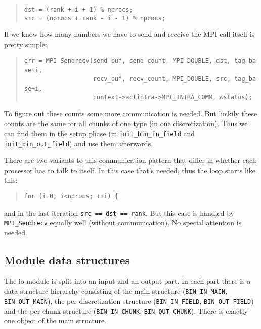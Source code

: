 \begin{quote}
\texttt{dst~=~(rank~+~i~+~1)~{\%}~nprocs;~}~\\
 \texttt{src~=~(nprocs~+~rank~-~i~-~1)~{\%}~nprocs; }
\end{quote}
If we know how many numbers we have to send and receive the MPI call
itself is pretty simple: 

\begin{quote}
\texttt{err~=~MPI{\_}Sendrecv(send{\_}buf,~send{\_}count,~MPI{\_}DOUBLE,~dst,~tag{\_}base+i,~}~\\
 \texttt{~~~~~~~~~~~~~~~~~~~recv{\_}buf,~recv{\_}count,~MPI{\_}DOUBLE,~src,~tag{\_}base+i,~}~\\
 \texttt{~~~~~~~~~~~~~~~~~~~context->actintra->MPI{\_}INTRA{\_}COMM,~{\&}status); }
\end{quote}
To figure out these counts some more communication is needed. But
luckily these counts are the same for all chunks of one type (in one
discretization). Thus we can find them in the setup phase (in \texttt{init{\_}bin{\_}in{\_}field}
and \texttt{init{\_}bin{\_}out{\_}field}) and use them afterwards.

There are two variants to this communication pattern that differ in
whether each processor has to talk to itself. In this case that's
needed, thus the loop starts like this: 

\begin{quote}
\texttt{for~(i=0;~i<nprocs;~++i)~{\{} }
\end{quote}
and in the last iteration \texttt{src == dst == rank}. But this case
is handled by \texttt{MPI{\_}Sendrecv} equally well (without communication).
No special attention is needed.


\subsection{Module data structures}

The io module is split into an input and an output part. In each part
there is a data structure hierarchy consisting of the main structure
(\texttt{BIN{\_}IN{\_}MAIN}, \texttt{BIN{\_}OUT{\_}MAIN}),
the per discretization structure (\texttt{BIN{\_}IN{\_}FIELD},
\texttt{BIN{\_}OUT{\_}FIELD}) and the per chunk structure (\texttt{BIN{\_}IN{\_}CHUNK},
\texttt{BIN{\_}OUT{\_}CHUNK}). There is exactly one object of
the main structure.


